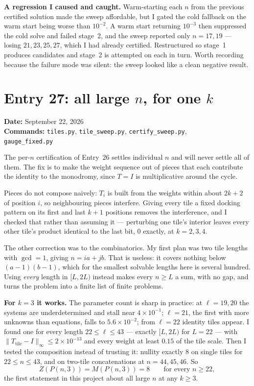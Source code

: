 \documentclass[12pt]{article}
\begin{document}
\textbf{A regression I caused and caught.} Warm-starting each $n$ from the
previous certified solution made the sweep affordable, but I gated the cold
fallback on the warm start being worse than $10^{-2}$. A warm start returning
$10^{-3}$ then suppressed the cold solve and failed stage~2, and the sweep
reported only $n=17,19$ --- losing $21,23,25,27$, which I had already certified.
Restructured so stage~1 produces candidates and stage~2 is attempted on each in
turn. Worth recording because the failure mode was silent: the sweep looked like
a clean negative result.


\clearpage
\section*{Entry 27: all large $n$, for one $k$}
\textbf{Date:} September 22, 2026\\
\textbf{Commands:} {\small\texttt{tiles.py}, \texttt{tile\_sweep.py},
\texttt{certify\_sweep.py},}\\
{\small\texttt{gauge\_fixed.py}}

The per-$n$ certification of Entry~26 settles individual $n$ and will never
settle all of them. The fix is to make the weight sequence out of pieces that
each contribute the identity to the monodromy, since $T=I$ is multiplicative
around the cycle.

Pieces do not compose naively: $T_i$ is built from the weights within about
$2k+2$ of position $i$, so neighbouring pieces interfere. Giving every tile a
fixed docking pattern on its first and last $k+1$ positions removes the
interference, and I checked that rather than assuming it --- perturbing one
tile's interior leaves every other tile's product identical to the last bit,
$0$ exactly, at $k=2,3,4$.

The other correction was to the combinatorics. My first plan was two tile
lengths with $\gcd=1$, giving $n=ia+jb$. That is useless: it covers nothing
below $(a-1)(b-1)$, which for the smallest solvable lengths here is several
hundred. Using \emph{every} length in $[L,2L)$ instead makes every $n\ge L$ a
sum, with no gap, and turns the problem into a finite list of finite problems.

\textbf{For $k=3$ it works.} The parameter count is sharp in practice: at
$\ell=19,20$ the systems are underdetermined and stall near $4\times10^{-1}$;
$\ell=21$, the first with more unknowns than equations, falls to
$5.6\times10^{-2}$; from $\ell=22$ identity tiles appear. I found one for every
length $22\le\ell\le43$ --- exactly $[L,2L)$ for $L=22$ --- with
$\|T_{\text{tile}}-I\|_\infty\le2\times10^{-13}$ and every weight at least
$0.15$ of the tile scale. Then I tested the composition instead of trusting it:
nullity exactly $8$ on single tiles for $22\le n\le43$, and on two-tile
concatenations at $n=44,45,46$. So
\[
  Z(P(n,3))=M(P(n,3))=8\qquad\text{for every }n\ge22,
\]
the first statement in this project about all large $n$ at any $k\ge3$.
\end{document}
